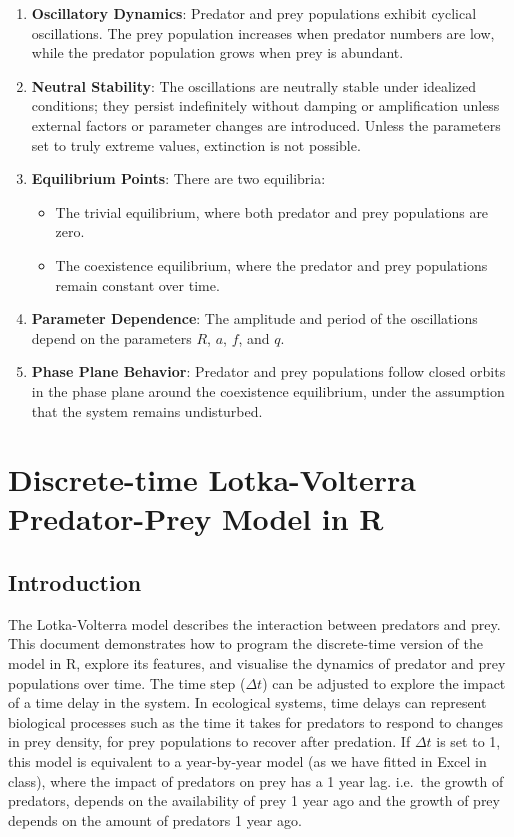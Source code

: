 \documentclass[
  a4paper]{book}
\providecommand{\tightlist}{%
  \setlength{\itemsep}{0pt}\setlength{\parskip}{0pt}}
\begin{document}
\begin{enumerate}
\def\labelenumi{\arabic{enumi}.}
\item
  \textbf{Oscillatory Dynamics}: Predator and prey populations exhibit cyclical oscillations. The prey population increases when predator numbers are low, while the predator population grows when prey is abundant.
\item
  \textbf{Neutral Stability}: The oscillations are neutrally stable under idealized conditions; they persist indefinitely without damping or amplification unless external factors or parameter changes are introduced. Unless the parameters set to truly extreme values, extinction is not possible.
\item
  \textbf{Equilibrium Points}: There are two equilibria:

  \begin{itemize}
  \tightlist
  \item
    The trivial equilibrium, where both predator and prey populations are zero.
  \item
    The coexistence equilibrium, where the predator and prey populations remain constant over time.
  \end{itemize}
\item
  \textbf{Parameter Dependence}: The amplitude and period of the oscillations depend on the parameters \(R\), \(a\), \(f\), and \(q\).
\item
  \textbf{Phase Plane Behavior}: Predator and prey populations follow closed orbits in the phase plane around the coexistence equilibrium, under the assumption that the system remains undisturbed.
\end{enumerate}

\chapter{Discrete-time Lotka-Volterra Predator-Prey Model in R}\label{discrete-time-lotka-volterra-predator-prey-model-in-r}

\section{Introduction}\label{introduction-1}

The Lotka-Volterra model describes the interaction between predators and prey. This document demonstrates how to program the discrete-time version of the model in R, explore its features, and visualise the dynamics of predator and prey populations over time. The time step (\(\Delta t\)) can be adjusted to explore the impact of a time delay in the system. In ecological systems, time delays can represent biological processes such as the time it takes for predators to respond to changes in prey density, for prey populations to recover after predation. If \(\Delta t\) is set to 1, this model is equivalent to a year-by-year model (as we have fitted in Excel in class), where the impact of predators on prey has a 1 year lag. i.e.~the growth of predators, depends on the availability of prey 1 year ago and the growth of prey depends on the amount of predators 1 year ago.
\end{document}
